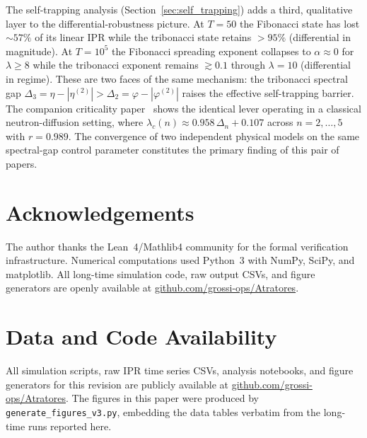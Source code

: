\documentclass[12pt,a4paper]{article}
\begin{document}
The self-trapping analysis (Section~\ref{sec:self_trapping}) adds a
third, qualitative layer to the differential-robustness picture.
At $T=50$ the Fibonacci state has lost $\sim\!57\%$ of its linear IPR
while the tribonacci state retains $>95\%$ (differential in magnitude).
At $T=10^5$ the Fibonacci spreading exponent collapses to
$\alpha \approx 0$ for $\lambda \geq 8$ while the tribonacci exponent
remains $\gtrsim 0.1$ through $\lambda=10$ (differential in regime).
These are two faces of the same mechanism: the tribonacci spectral gap
$\Delta_3 = \eta - |\eta^{(2)}| > \Delta_2 = \varphi - |\varphi^{(2)}|$
raises the effective self-trapping barrier.  The companion criticality
paper~\cite{Grossi2026Criticality} shows the identical lever operating
in a classical neutron-diffusion setting, where $\lambda_c(n) \approx
0.958\,\Delta_n + 0.107$ across $n = 2, \ldots, 5$ with $r = 0.989$.
The convergence of two independent physical models on the same
spectral-gap control parameter constitutes the primary finding of this
pair of papers.

\section*{Acknowledgements}

The author thanks the Lean~4/Mathlib4 community for the formal verification
infrastructure. Numerical computations used Python~3 with NumPy, SciPy, and
matplotlib. All long-time simulation code, raw output CSVs, and figure
generators are openly available at
\href{https://github.com/grossi-ops/Atratores}{github.com/grossi-ops/Atratores}.

\section*{Data and Code Availability}

All simulation scripts, raw IPR time series CSVs, analysis notebooks, and
figure generators for this revision are publicly available at
\href{https://github.com/grossi-ops/Atratores}{github.com/grossi-ops/Atratores}.
The figures in this paper were produced by
\texttt{generate\_figures\_v3.py}, embedding the data tables verbatim from
the long-time runs reported here.
\end{document}
